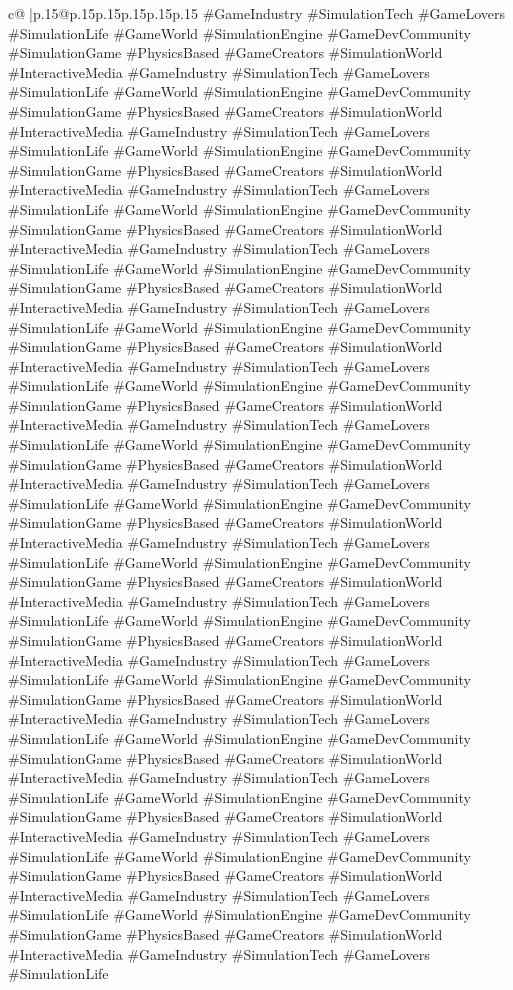 \documentclass{article}
\begin{document}
{\begin{supertabular}{c@{$\;$}|p{.15\linewidth}@{}p{.15\linewidth}p{.15\linewidth}p{.15\linewidth}p{.15\linewidth}p{.15\linewidth}}
{{{\#GameIndustry \#SimulationTech \#GameLovers \#SimulationLife \#GameWorld \#SimulationEngine \#GameDevCommunity \#SimulationGame \#PhysicsBased \#GameCreators \#SimulationWorld \#InteractiveMedia \#GameIndustry \#SimulationTech \#GameLovers \#SimulationLife \#GameWorld \#SimulationEngine \#GameDevCommunity \#SimulationGame \#PhysicsBased \#GameCreators \#SimulationWorld \#InteractiveMedia \#GameIndustry \#SimulationTech \#GameLovers \#SimulationLife \#GameWorld \#SimulationEngine \#GameDevCommunity \#SimulationGame \#PhysicsBased \#GameCreators \#SimulationWorld \#InteractiveMedia \#GameIndustry \#SimulationTech \#GameLovers \#SimulationLife \#GameWorld \#SimulationEngine \#GameDevCommunity \#SimulationGame \#PhysicsBased \#GameCreators \#SimulationWorld \#InteractiveMedia \#GameIndustry \#SimulationTech \#GameLovers \#SimulationLife \#GameWorld \#SimulationEngine \#GameDevCommunity \#SimulationGame \#PhysicsBased \#GameCreators \#SimulationWorld \#InteractiveMedia \#GameIndustry \#SimulationTech \#GameLovers \#SimulationLife \#GameWorld \#SimulationEngine \#GameDevCommunity \#SimulationGame \#PhysicsBased \#GameCreators \#SimulationWorld \#InteractiveMedia \#GameIndustry \#SimulationTech \#GameLovers \#SimulationLife \#GameWorld \#SimulationEngine \#GameDevCommunity \#SimulationGame \#PhysicsBased \#GameCreators \#SimulationWorld \#InteractiveMedia \#GameIndustry \#SimulationTech \#GameLovers \#SimulationLife \#GameWorld \#SimulationEngine \#GameDevCommunity \#SimulationGame \#PhysicsBased \#GameCreators \#SimulationWorld \#InteractiveMedia \#GameIndustry \#SimulationTech \#GameLovers \#SimulationLife \#GameWorld \#SimulationEngine \#GameDevCommunity \#SimulationGame \#PhysicsBased \#GameCreators \#SimulationWorld \#InteractiveMedia \#GameIndustry \#SimulationTech \#GameLovers \#SimulationLife \#GameWorld \#SimulationEngine \#GameDevCommunity \#SimulationGame \#PhysicsBased \#GameCreators \#SimulationWorld \#InteractiveMedia \#GameIndustry \#SimulationTech \#GameLovers \#SimulationLife \#GameWorld \#SimulationEngine \#GameDevCommunity \#SimulationGame \#PhysicsBased \#GameCreators \#SimulationWorld \#InteractiveMedia \#GameIndustry \#SimulationTech \#GameLovers \#SimulationLife \#GameWorld \#SimulationEngine \#GameDevCommunity \#SimulationGame \#PhysicsBased \#GameCreators \#SimulationWorld \#InteractiveMedia \#GameIndustry \#SimulationTech \#GameLovers \#SimulationLife \#GameWorld \#SimulationEngine \#GameDevCommunity \#SimulationGame \#PhysicsBased \#GameCreators \#SimulationWorld \#InteractiveMedia \#GameIndustry \#SimulationTech \#GameLovers \#SimulationLife \#GameWorld \#SimulationEngine \#GameDevCommunity \#SimulationGame \#PhysicsBased \#GameCreators \#SimulationWorld \#InteractiveMedia \#GameIndustry \#SimulationTech \#GameLovers \#SimulationLife \#GameWorld \#SimulationEngine \#GameDevCommunity \#SimulationGame \#PhysicsBased \#GameCreators \#SimulationWorld \#InteractiveMedia \#GameIndustry \#SimulationTech \#GameLovers \#SimulationLife \#GameWorld \#SimulationEngine \#GameDevCommunity \#SimulationGame \#PhysicsBased \#GameCreators \#SimulationWorld \#InteractiveMedia \#GameIndustry \#SimulationTech \#GameLovers \#SimulationLife }}}
\end{supertabular}}
\end{document}
